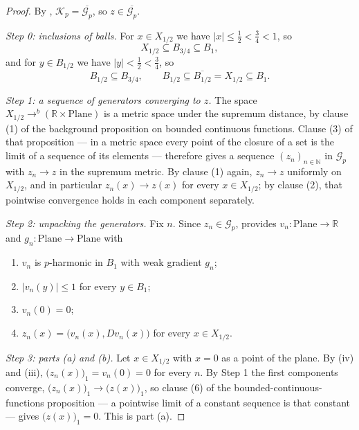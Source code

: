 \begin{proof}
By , $\mathcal{K}_p=\overline{\mathcal{G}_p}$, so
$z\in\overline{\mathcal{G}_p}$.

\medskip\noindent\emph{Step 0: inclusions of balls.}
For $x\in X_{1/2}$ we have $\lvert x\rvert\le\tfrac12<\tfrac34<1$, so
\begin{equation}\label{eq:cjp-incl}
  X_{1/2}\subseteq B_{3/4}\subseteq B_1 ,
\end{equation}
and for $y\in B_{1/2}$ we have $\lvert y\rvert<\tfrac12<\tfrac34$, so
\begin{equation}\label{eq:cjp-incl2}
  B_{1/2}\subseteq B_{3/4},\qquad B_{1/2}\subseteq\overline{B_{1/2}}=X_{1/2}\subseteq B_1 .
\end{equation}

\medskip\noindent\emph{Step 1: a sequence of generators converging to $z$.}
The space $X_{1/2}\to^{b}(\mathbb{R}\times\mathrm{Plane})$ is a metric space under the supremum
distance, by clause (1) of the background proposition on bounded continuous functions.  Clause
(3) of that proposition --- in a metric space every point of the closure of a set is the limit
of a sequence of its elements --- therefore gives a sequence $(z_n)_{n\in\mathbb{N}}$ in
$\mathcal{G}_p$ with $z_n\to z$ in the supremum metric.  By clause (1) again, $z_n\to z$
uniformly on $X_{1/2}$, and in particular $z_n(x)\to z(x)$ for every $x\in X_{1/2}$; by clause
(2), that pointwise convergence holds in each component separately.

\medskip\noindent\emph{Step 2: unpacking the generators.}
Fix $n$.  Since $z_n\in\mathcal{G}_p$,  provides
$v_n\colon\mathrm{Plane}\to\mathbb{R}$ and $g_n\colon\mathrm{Plane}\to\mathrm{Plane}$ with
\begin{enumerate}
\item[(i)] $v_n$ is $p$-harmonic in $B_1$ with weak gradient $g_n$;
\item[(ii)] $\lvert v_n(y)\rvert\le1$ for every $y\in B_1$;
\item[(iii)] $v_n(0)=0$;
\item[(iv)] $z_n(x)=\bigl(v_n(x),Dv_n(x)\bigr)$ for every $x\in X_{1/2}$.
\end{enumerate}

\medskip\noindent\emph{Step 3: parts (a) and (b).}
Let $x\in X_{1/2}$ with $x=0$ as a point of the plane.  By (iv) and (iii),
$\bigl(z_n(x)\bigr)_1=v_n(0)=0$ for every $n$.  By Step 1 the first components converge,
$\bigl(z_n(x)\bigr)_1\to\bigl(z(x)\bigr)_1$, so clause (6) of the
bounded-continuous-functions proposition --- a pointwise limit of a constant sequence is that
constant --- gives $\bigl(z(x)\bigr)_1=0$.  This is part (a).


\end{proof}
